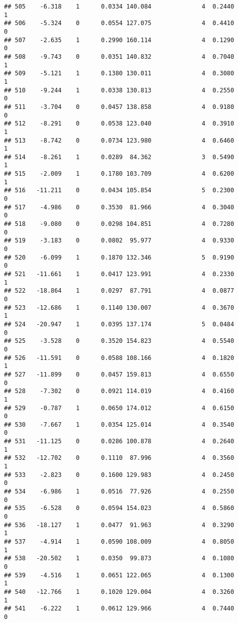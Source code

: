 \documentclass[
]{article}
\begin{document}
\begin{verbatim}
## 505    -6.318    1      0.0334 140.084              4  0.2440      1
## 506    -5.324    0      0.0554 127.075              4  0.4410      0
## 507    -2.635    1      0.2990 160.114              4  0.1290      0
## 508    -9.743    0      0.0351 140.832              4  0.7040      1
## 509    -5.121    1      0.1380 130.011              4  0.3080      1
## 510    -9.244    1      0.0338 130.813              4  0.2550      0
## 511    -3.704    0      0.0457 138.858              4  0.9180      0
## 512    -8.291    0      0.0538 123.040              4  0.3910      1
## 513    -8.742    0      0.0734 123.980              4  0.6460      1
## 514    -8.261    1      0.0289  84.362              3  0.5490      1
## 515    -2.009    1      0.1780 103.709              4  0.6200      1
## 516   -11.211    0      0.0434 105.854              5  0.2300      0
## 517    -4.986    0      0.3530  81.966              4  0.3040      0
## 518    -9.080    0      0.0298 104.851              4  0.7280      0
## 519    -3.183    0      0.0802  95.977              4  0.9330      0
## 520    -6.099    1      0.1870 132.346              5  0.9190      0
## 521   -11.661    1      0.0417 123.991              4  0.2330      1
## 522   -18.864    1      0.0297  87.791              4  0.0877      0
## 523   -12.686    1      0.1140 130.007              4  0.3670      1
## 524   -20.947    1      0.0395 137.174              5  0.0484      0
## 525    -3.528    0      0.3520 154.823              4  0.5540      0
## 526   -11.591    0      0.0588 108.166              4  0.1820      1
## 527   -11.899    0      0.0457 159.813              4  0.6550      0
## 528    -7.302    0      0.0921 114.019              4  0.4160      1
## 529    -0.787    1      0.0650 174.012              4  0.6150      0
## 530    -7.667    1      0.0354 125.014              4  0.3540      0
## 531   -11.125    0      0.0286 100.878              4  0.2640      1
## 532   -12.702    0      0.1110  87.996              4  0.3560      1
## 533    -2.823    0      0.1600 129.983              4  0.2450      0
## 534    -6.986    1      0.0516  77.926              4  0.2550      0
## 535    -6.528    0      0.0594 154.023              4  0.5860      0
## 536   -18.127    1      0.0477  91.963              4  0.3290      1
## 537    -4.914    1      0.0590 108.009              4  0.8050      1
## 538   -20.502    1      0.0350  99.873              4  0.1080      0
## 539    -4.516    1      0.0651 122.065              4  0.1300      1
## 540   -12.766    1      0.1020 129.004              4  0.3260      1
## 541    -6.222    1      0.0612 129.966              4  0.7440      0

\end{verbatim}
\end{document}
